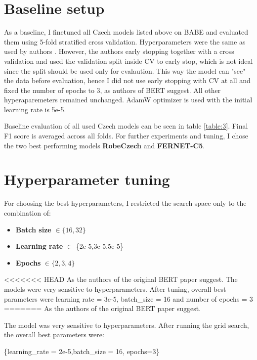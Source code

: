  \section{Baseline setup}
 As a baseline, I finetuned all Czech models listed above on BABE and evaluated them using 5-fold stratified cross validation. Hyperparameters were the same as used by authors \cite{Spinde2021MBIC}. However, the authors early stopping together with a cross validation and used the validation split inside CV to early stop, which is not ideal since the split should be used only for evalaution. This way the model can "see" the data before evaluation, hence I did not use early stopping with CV at all and fixed the number of epochs to 3, as authors of BERT \cite{devlin2019bert} suggest. 
 All other hyperaparemeters remained unchanged. AdamW optimizer is used with the initial learning rate is 5e-5. 
 
 Baseline evaluation of all used Czech models can be seen in table \ref{table:3}. Final F1 score is averaged across all folds. For further experiments and tuning, I chose the two best performing models \textbf{RobeCzech} and \textbf{FERNET-C5}.
 
 
 
 
 \section{Hyperparameter tuning}
For choosing the best hyperparameters, I restricted the search space only to the combination of:
 \begin{itemize}
     \item \textbf{Batch size} $\in \{16,32\}$
     \item \textbf{Learning rate} $\in $ \{2e-5,3e-5,5e-5\}
     \item \textbf{Epochs} $\in \{2,3,4\}$
 \end{itemize}
 
<<<<<<< HEAD
 As the authors of the original BERT paper suggest. The models were very sensitive to hyperparameters. After tuning, overall best parameters were learning rate = 3e-5, batch\_size = 16 and number of epochs = 3  
=======
 As the authors of the original BERT paper suggest. 
 
 The model was very sensitive to hyperparameters. After running the grid search, the overall best parameters were:
 \begin{center}
      \{learning\_rate = 2e-5,batch\_size = 16, epochs=3\}
 \end{center}


